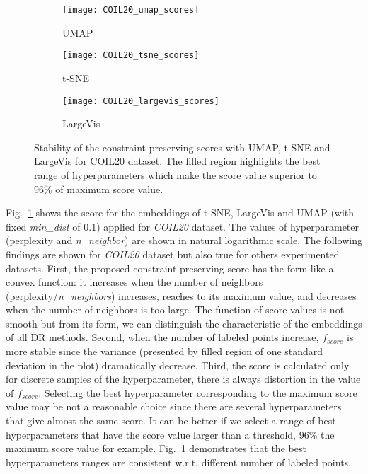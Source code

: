 \begin{figure}%
\begin{subfigure}[b]{0.32\linewidth}
     \centering
     \texttt{[image: COIL20\_umap\_scores]}
     \caption{UMAP}
\end{subfigure}
\hfill
\begin{subfigure}[b]{0.32\linewidth}
     \centering
     \texttt{[image: COIL20\_tsne\_scores]}
     \caption{t-SNE}
\end{subfigure}
\hfill
\begin{subfigure}[b]{0.32\linewidth}
     \centering
     \texttt{[image: COIL20\_largevis\_scores]}
     \caption{LargeVis}
\end{subfigure}
\caption{Stability of the constraint preserving scores with UMAP, t-SNE and LargeVis for COIL20 dataset.
The filled region highlights the best range of hyperparameters which make the score value superior to 96\% of maximum score value.}
\label{fig:score:stability:COIL20}
\end{figure}

Fig.~\ref{fig:score:stability:COIL20} shows the score for the embeddings of t-SNE, LargeVis and UMAP (with fixed \emph{min\_dist} of 0.1) applied for \emph{COIL20} dataset.
The values of hyperparameter (perplexity and \emph{n\_neighbor}) are shown in natural logarithmic scale.
The following findings are shown for \emph{COIL20} dataset but also true for others experimented datasets.
First, the proposed constraint preserving score has the form like a convex function: it increases when the number of neighbors (perplexity/\emph{n\_neighbors}) increases, reaches to its maximum value, and decreases when the number of neighbors is too large.
The function of score values is not smooth but from its form, we can distinguish the characteristic of the embeddings of all DR methods.
Second, when the number of labeled points increase, $f_{score}$ is more stable since the variance (presented by filled region of one standard deviation in the plot) dramatically decrease.
Third, the score is calculated only for discrete samples of the hyperparameter, there is always distortion in the value of $f_{score}$.
Selecting the best hyperparameter corresponding to the maximum score value may be not a reasonable choice since there are several hyperparameters that give almost the same score.
It can be better if we select a range of best hyperparameters that have the score value larger than a threshold, 96\% the maximum score value for example.
Fig.~\ref{fig:score:stability:COIL20} demonstrates that the best hyperparameters ranges are consistent w.r.t. different number of labeled points.


